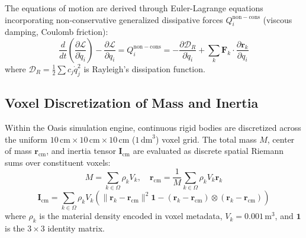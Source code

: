 The equations of motion are derived through Euler-Lagrange equations incorporating non-conservative generalized dissipative forces $Q_i^{\mathrm{non-cons}}$ (viscous damping, Coulomb friction):
\begin{equation}
\frac{d}{dt}\left(\frac{\partial \mathcal{L}}{\partial \dot{q}_i}\right) - \frac{\partial \mathcal{L}}{\partial q_i} = Q_i^{\mathrm{non-cons}} = -\frac{\partial \mathcal{D}_R}{\partial \dot{q}_i} + \sum_{k} \mathbf{F}_k \cdot \frac{\partial \mathbf{r}_k}{\partial q_i}
\label{eq:euler_lagrange}
\end{equation}
where $\mathcal{D}_R = \frac{1}{2} \sum c_j \dot{q}_j^2$ is Rayleigh's dissipation function.

\subsection{Voxel Discretization of Mass and Inertia}
Within the Oasis simulation engine, continuous rigid bodies are discretized across the uniform $10\,\mathrm{cm} \times 10\,\mathrm{cm} \times 10\,\mathrm{cm}$ ($1\,\mathrm{dm}^3$) voxel grid. The total mass $M$, center of mass $\mathbf{r}_{\mathrm{cm}}$, and inertia tensor $\mathbf{I}_{\mathrm{cm}}$ are evaluated as discrete spatial Riemann sums over constituent voxels:
\begin{equation}
M = \sum_{k \in \Omega} \rho_k V_k, \quad \mathbf{r}_{\mathrm{cm}} = \frac{1}{M} \sum_{k \in \Omega} \rho_k V_k \mathbf{r}_k
\label{eq:voxel_mass_center}
\end{equation}
\begin{equation}
\mathbf{I}_{\mathrm{cm}} = \sum_{k \in \Omega} \rho_k V_k \left( \|\mathbf{r}_k - \mathbf{r}_{\mathrm{cm}}\|^2 \mathbf{1} - (\mathbf{r}_k - \mathbf{r}_{\mathrm{cm}}) \otimes (\mathbf{r}_k - \mathbf{r}_{\mathrm{cm}}) \right)
\label{eq:voxel_inertia_tensor}
\end{equation}
where $\rho_k$ is the material density encoded in voxel metadata, $V_k = 0.001\,\mathrm{m^3}$, and $\mathbf{1}$ is the $3\times 3$ identity matrix.


